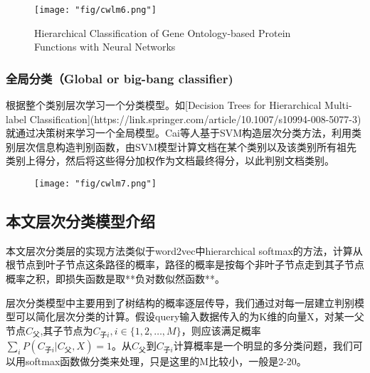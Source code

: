 \begin{figure}[!h]
	\centering
	\texttt{[image: "fig/cwlm6.png"]}
	\caption{Hierarchical Classification of Gene Ontology-based Protein Functions with Neural Networks}
	\label{fig:cwlm6}
\end{figure}


\subsubsection{全局分类（Global or big-bang classifier)}

根据整个类别层次学习一个分类模型。如[Decision Trees for Hierarchical Multi-label Classification](https://link.springer.com/article/10.1007/s10994-008-5077-3)就通过决策树来学习一个全局模型。Cai等人基于SVM构造层次分类方法，利用类别层次信息构造判别函数，由SVM模型计算文档在某个类别以及该类别所有祖先类别上得分，然后将这些得分加权作为文档最终得分，以此判别文档类别。
\begin{figure}[!h]
	\centering
	\texttt{[image: "fig/cwlm7.png"]}
	\caption{}
	\label{fig:cwlm7}
\end{figure}

\subsection{本文层次分类模型介绍}
本文层次分类层的实现方法类似于word2vec中hierarchical softmax的方法，计算从根节点到叶子节点这条路径的概率，路径的概率是按每个非叶子节点走到其子节点概率之积，即损失函数是取**负对数似然函数**。
\par 层次分类模型中主要用到了树结构的概率逐层传导，我们通过对每一层建立判别模型可以简化层次分类的计算。假设query输入数据传入的为K维的向量X，对某一父节点$C_{父}$,其子节点为$C_{子i}, i \in \{1,2,\dots,M\}$，则应该满足概率$\sum\limits_{i}P(C_{子i}|C_{父},X)=1$。从$C_{父}$到$C_{子i}$计算概率是一个明显的多分类问题，我们可以用softmax函数做分类来处理，只是这里的M比较小，一般是2-20。

